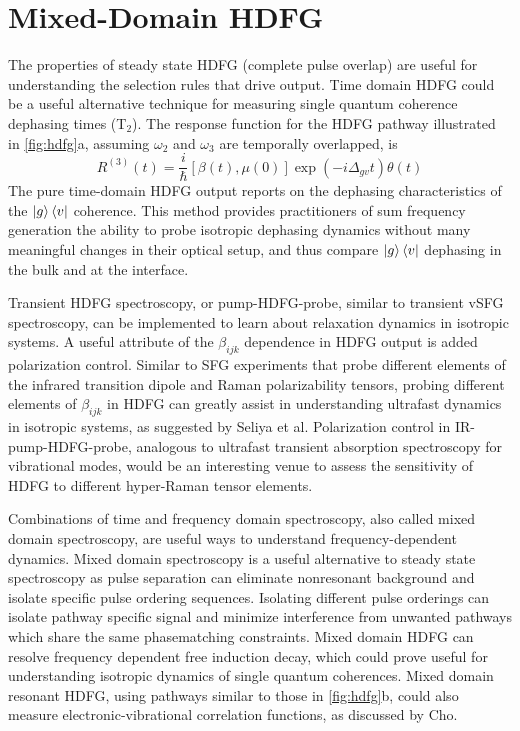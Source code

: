 \documentclass[aip, jcp, reprint, onecolumn]{revtex4-2}
\begin{document}
\section{Mixed-Domain HDFG}\label{mixeddomain}
The properties of steady state HDFG (complete pulse overlap) are useful for understanding the selection rules that drive output.
Time domain HDFG could be a useful alternative technique for measuring single quantum coherence dephasing times (T$_2$).
The response function for the HDFG pathway illustrated in \autoref{fig:hdfg}a, assuming $\omega_2$ and $\omega_3$ are temporally overlapped, is \cite{RN287, Cho2001}
\begin{equation}
	R^{(3)}(t) = \frac{i}{\hbar} [\beta(t), \mu(0)] \exp(-i\Delta_{gv}t) \theta(t) 
\end{equation}  
The pure time-domain HDFG output reports on the dephasing characteristics of the $\ket{g}\bra{v}$ coherence. 
This method provides practitioners of sum frequency generation the ability to probe isotropic dephasing dynamics without many meaningful changes in their optical setup, and thus compare $\ket{g}\bra{v}$ dephasing in the bulk and at the interface.\cite{RN224}

Transient HDFG spectroscopy, or pump-HDFG-probe, similar to transient vSFG spectroscopy, can be implemented to learn about relaxation dynamics in isotropic systems. \cite{RN224, Bonn2024}
A useful attribute of the $\beta_{ijk}$ dependence in HDFG output is added polarization control. 
Similar to SFG experiments that probe different elements of the infrared transition dipole and Raman polarizability tensors, probing different elements of $\beta_{ijk}$ in HDFG can greatly assist in understanding ultrafast dynamics in isotropic systems, as suggested by Seliya et al. \cite{Shen90, RN224, Bonn2024}
Polarization control in IR-pump-HDFG-probe, analogous to ultrafast transient absorption spectroscopy for vibrational modes, would be an interesting venue to assess the sensitivity of HDFG to different hyper-Raman tensor elements. 

Combinations of time and frequency domain spectroscopy, also called mixed domain spectroscopy, are useful ways to understand frequency-dependent dynamics. \cite{RN135, RN171, RN131}
Mixed domain spectroscopy is a useful alternative to steady state spectroscopy as pulse separation can eliminate nonresonant background and isolate specific pulse ordering sequences. \cite{RN372, RN324, McDonnell2024}
Isolating different pulse orderings can isolate pathway specific signal and minimize interference from unwanted pathways which share the same phasematching constraints. 
Mixed domain HDFG can resolve frequency dependent free induction decay, which could prove useful for understanding isotropic dynamics of single quantum coherences. 
Mixed domain resonant HDFG, using pathways similar to those in \autoref{fig:hdfg}b, could also measure electronic-vibrational correlation functions, as discussed by Cho. \cite{Cho2001}
\end{document}
